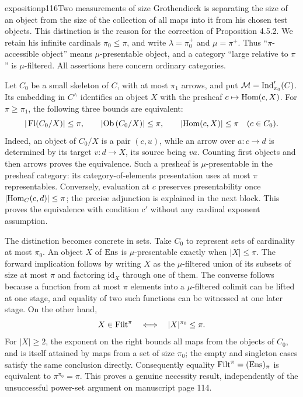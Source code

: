 

\begin{dcomment}{exposition}{p116}{Two measurements of size}
Grothendieck is separating the size of an object from the size of the collection of all maps into it from his chosen test objects. This distinction is the reason for the correction of Proposition 4.5.2. We retain his infinite cardinals $\pi_0\leq\pi$, and write $\lambda=\pi_0^+$ and $\mu=\pi^+$. Thus ``$\pi$-accessible object'' means $\mu$-presentable object, and a category ``large relative to $\pi$'' is $\mu$-filtered. All assertions here concern ordinary categories.

Let $C_0$ be a small skeleton of $C$, with at most $\pi_1$ arrows, and put $\mathcal M=\operatorname{Ind}'_{\pi_0}(C)$. Its embedding in $C^\wedge$ identifies an object $X$ with the presheaf $c\mapsto\mathrm{Hom}(c,X)$. For $\pi\geq\pi_1$, the following three bounds are equivalent:
\[
 |\operatorname{Fl}(C_0/X)|\leq\pi,
 \qquad |\mathrm{Ob}\,(C_0/X)|\leq\pi,
 \qquad |\mathrm{Hom}(c,X)|\leq\pi\quad(c\in C_0).
\]
Indeed, an object of $C_0/X$ is a pair $(c,u)$, while an arrow over $a:c\to d$ is determined by its target $v:d\to X$, its source being $va$. Counting first objects and then arrows proves the equivalence. Such a presheaf is $\mu$-presentable in the presheaf category: its category-of-elements presentation uses at most $\pi$ representables. Conversely, evaluation at $c$ preserves presentability once $|\mathrm{Hom}_C(c,d)|\leq\pi$; the precise adjunction is explained in the next block. This proves the equivalence with condition c$'$ without any cardinal exponent assumption.

The distinction becomes concrete in sets. Take $C_0$ to represent sets of cardinality at most $\pi_0$. An object $X$ of $\mathrm{Ens}$ is $\mu$-presentable exactly when $|X|\leq\pi$. The forward implication follows by writing $X$ as the $\mu$-filtered union of its subsets of size at most $\pi$ and factoring $\mathrm{id}_X$ through one of them. The converse follows because a function from at most $\pi$ elements into a $\mu$-filtered colimit can be lifted at one stage, and equality of two such functions can be witnessed at one later stage. On the other hand,
\[
 X\in\operatorname{Filt}^\pi
 \quad\Longleftrightarrow\quad |X|^{\pi_0}\leq\pi.
\]
For $|X|\geq2$, the exponent on the right bounds all maps from the objects of $C_0$, and is itself attained by maps from a set of size $\pi_0$; the empty and singleton cases satisfy the same conclusion directly. Consequently equality $\operatorname{Filt}^\pi=(\mathrm{Ens})_\pi$ is equivalent to $\pi^{\pi_0}=\pi$. This proves a genuine necessity result, independently of the unsuccessful power-set argument on manuscript page 114.


\end{dcomment}

